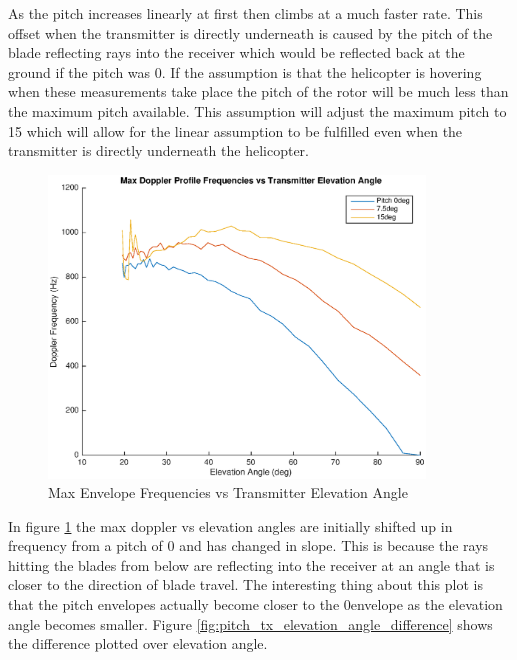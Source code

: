 As the pitch increases linearly at first then climbs at a much faster rate. This offset when the transmitter is directly underneath is caused by the pitch of the blade reflecting rays into the receiver which would be reflected back at the ground if the pitch was 0\textdegree. If the assumption is that the helicopter is hovering when these measurements take place the pitch of the rotor will be much less than the maximum pitch available. This assumption will adjust the maximum pitch to 15 \textdegree \space which will allow for the linear assumption to be fulfilled even when the transmitter is directly underneath the helicopter.

\begin{figure}
	\begin{center}
		\includegraphics[width=10cm]{images/simulation/elevation_angle_with_pitch_max_doppler.eps}
		\caption{Max Envelope Frequencies vs Transmitter Elevation Angle}
		\label{fig:pitch_tx_elevation_angle}
	\end{center}
\end{figure}

In figure \ref{fig:pitch_tx_elevation_angle} the max doppler vs elevation angles are initially shifted up in frequency from a pitch of 0 and has changed in slope. This is because the rays hitting the blades from below are reflecting into the receiver at an angle that is closer to the direction of blade travel. The interesting thing about this plot is that the pitch envelopes actually become closer to the 0\textdegree \space envelope as the elevation angle becomes smaller. Figure \ref{fig:pitch_tx_elevation_angle_difference} shows the difference plotted over elevation angle.

